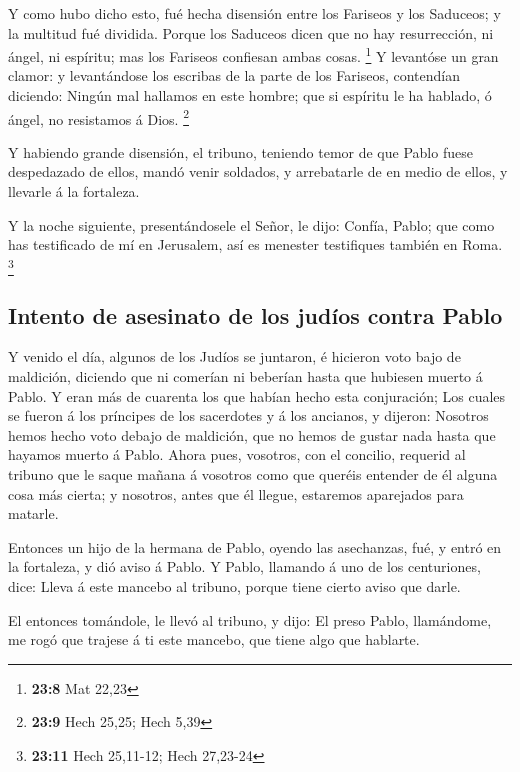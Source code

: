  Y como hubo dicho esto, fué hecha disensión entre los
Fariseos y los Saduceos; y la multitud fué dividida. 
Porque los Saduceos dicen que no hay resurrección, ni ángel, ni
espíritu; mas los Fariseos confiesan ambas cosas. \footnote{\textbf{23:8}
  Mat 22,23}  Y levantóse un gran clamor: y levantándose
los escribas de la parte de los Fariseos, contendían diciendo: Ningún
mal hallamos en este hombre; que si espíritu le ha hablado, ó ángel, no
resistamos á Dios. \footnote{\textbf{23:9} Hech 25,25; Hech 5,39}

 Y habiendo grande disensión, el tribuno, teniendo temor
de que Pablo fuese despedazado de ellos, mandó venir soldados, y
arrebatarle de en medio de ellos, y llevarle á la fortaleza.

 Y la noche siguiente, presentándosele el Señor, le dijo:
Confía, Pablo; que como has testificado de mí en Jerusalem, así es
menester testifiques también en Roma. \footnote{\textbf{23:11} Hech
  25,11-12; Hech 27,23-24}

\hypertarget{intento-de-asesinato-de-los-juduxedos-contra-pablo}{%
\subsection{Intento de asesinato de los judíos contra
Pablo}\label{intento-de-asesinato-de-los-juduxedos-contra-pablo}}

 Y venido el día, algunos de los Judíos se juntaron, é
hicieron voto bajo de maldición, diciendo que ni comerían ni beberían
hasta que hubiesen muerto á Pablo.  Y eran más de
cuarenta los que habían hecho esta conjuración;  Los
cuales se fueron á los príncipes de los sacerdotes y á los ancianos, y
dijeron: Nosotros hemos hecho voto debajo de maldición, que no hemos de
gustar nada hasta que hayamos muerto á Pablo.  Ahora
pues, vosotros, con el concilio, requerid al tribuno que le saque mañana
á vosotros como que queréis entender de él alguna cosa más cierta; y
nosotros, antes que él llegue, estaremos aparejados para matarle.

 Entonces un hijo de la hermana de Pablo, oyendo las
asechanzas, fué, y entró en la fortaleza, y dió aviso á Pablo.
 Y Pablo, llamando á uno de los centuriones, dice: Lleva
á este mancebo al tribuno, porque tiene cierto aviso que darle.

 El entonces tomándole, le llevó al tribuno, y dijo: El
preso Pablo, llamándome, me rogó que trajese á ti este mancebo, que
tiene algo que hablarte.


